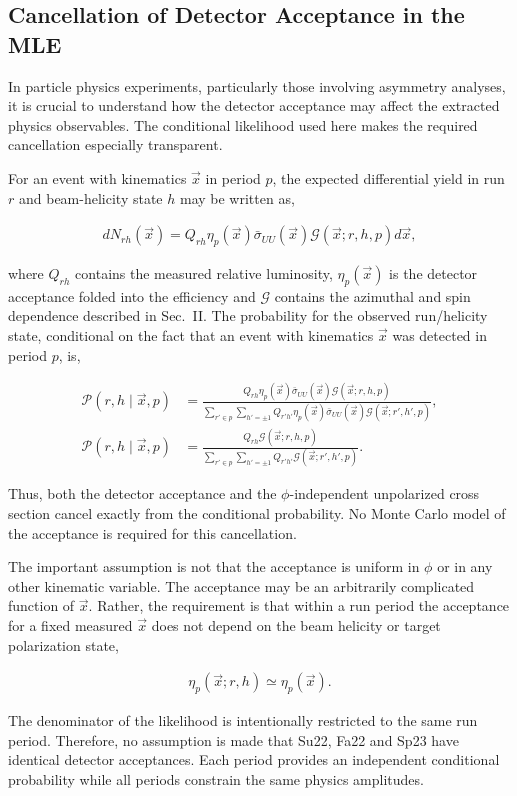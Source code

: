 \subsection{Cancellation of Detector Acceptance in the MLE}

In particle physics experiments, particularly those involving asymmetry analyses, it is crucial to understand how the detector acceptance may affect the extracted physics observables. The conditional likelihood used here makes the required cancellation especially transparent.

For an event with kinematics $\vec{x}$ in period $p$, the expected differential yield in run $r$ and beam-helicity state $h$ may be written as,
\begin{linenomath}
    \begin{align}
        dN_{rh}(\vec{x}) = Q_{rh}\eta_p(\vec{x})\bar{\sigma}_{UU}(\vec{x})\mathcal{G}(\vec{x};r,h,p)d\vec{x},
    \end{align}
\end{linenomath}
where $Q_{rh}$ contains the measured relative luminosity, $\eta_p(\vec{x})$ is the detector acceptance folded into the efficiency and $\mathcal{G}$ contains the azimuthal and spin dependence described in Sec.~II. The probability for the observed run/helicity state, conditional on the fact that an event with kinematics $\vec{x}$ was detected in period $p$, is,
\begin{linenomath}
    \begin{align}
        \mathcal{P}(r,h\mid\vec{x},p) &= \frac{Q_{rh}\eta_p(\vec{x})\bar{\sigma}_{UU}(\vec{x})\mathcal{G}(\vec{x};r,h,p)}{\displaystyle\sum_{r'\in p}\sum_{h'=\pm1}Q_{r'h'}\eta_p(\vec{x})\bar{\sigma}_{UU}(\vec{x})\mathcal{G}(\vec{x};r',h',p)},\\
        \mathcal{P}(r,h\mid\vec{x},p) &= \frac{Q_{rh}\mathcal{G}(\vec{x};r,h,p)}{\displaystyle\sum_{r'\in p}\sum_{h'=\pm1}Q_{r'h'}\mathcal{G}(\vec{x};r',h',p)}.
    \end{align}
\end{linenomath}
Thus, both the detector acceptance and the $\phi$-independent unpolarized cross section cancel exactly from the conditional probability. No Monte Carlo model of the acceptance is required for this cancellation.

The important assumption is not that the acceptance is uniform in $\phi$ or in any other kinematic variable. The acceptance may be an arbitrarily complicated function of $\vec{x}$. Rather, the requirement is that within a run period the acceptance for a fixed measured $\vec{x}$ does not depend on the beam helicity or target polarization state,
\begin{linenomath}
    \begin{align}
        \eta_p(\vec{x};r,h) \simeq \eta_p(\vec{x}).
    \end{align}
\end{linenomath}
The denominator of the likelihood is intentionally restricted to the same run period. Therefore, no assumption is made that Su22, Fa22 and Sp23 have identical detector acceptances. Each period provides an independent conditional probability while all periods constrain the same physics amplitudes.

